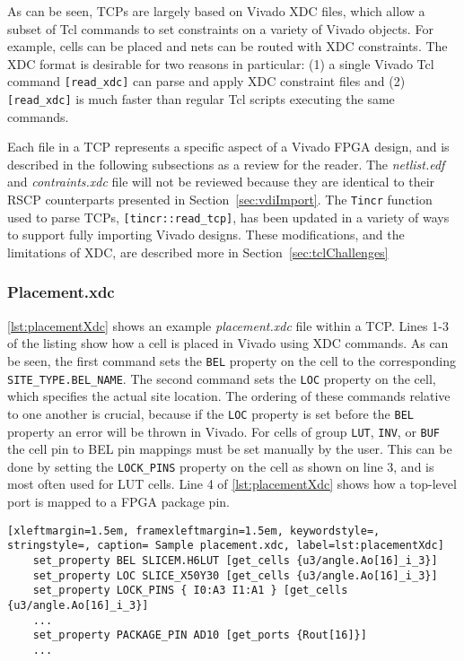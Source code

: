 \noindent As can be seen, TCPs are largely based on Vivado XDC files, which
allow a subset of Tcl commands to set constraints on a variety
of Vivado objects. For example, cells can be placed and nets can be routed with
XDC constraints. The XDC format is desirable for two reasons in particular: (1)
a single Vivado Tcl command \texttt{[read\_xdc]} can parse and apply XDC
constraint files and (2) \texttt{[read\_xdc]} is much faster than regular Tcl
scripts executing the same commands.

Each file in a TCP represents a specific aspect of a Vivado FPGA design, and is
described in the following subsections as a review for the reader. The
\textit{netlist.edf} and \textit{contraints.xdc} file will not be reviewed
because they are identical to their RSCP counterparts presented in
Section~\ref{sec:vdiImport}. The \texttt{Tincr} function used to parse TCPs,
\texttt{[tincr::read\_tcp]}, has been updated in a variety of ways to support
fully importing Vivado designs. These modifications, and the limitations of
XDC, are described more in Section~\ref{sec:tclChallenges}

\subsubsection{Placement.xdc}
\autoref{lst:placementXdc} shows an example \textit{placement.xdc} file within a
TCP. Lines 1-3 of the listing show how a cell is placed in Vivado using XDC
commands. As can be seen, the first command sets the \texttt{BEL} property on
the cell to the corresponding \texttt{SITE\_TYPE.BEL\_NAME}. The second command
sets the \texttt{LOC} property on the cell, which specifies the actual site
location. The ordering of these commands relative to one another is crucial,
because if the \texttt{LOC} property is set before the \texttt{BEL} property an
error will be thrown in Vivado. For cells of group \texttt{LUT}, \texttt{INV},
or \texttt{BUF} the cell pin to BEL pin mappings must be set manually by the user. 
This can be done by setting the \texttt{LOCK\_PINS} property on the cell as
shown on line 3, and is most often used for LUT cells. Line 4 of
\autoref{lst:placementXdc} shows how a top-level port is mapped  to a FPGA
package pin.

\begin{lstlisting}[xleftmargin=1.5em, framexleftmargin=1.5em, keywordstyle=,
stringstyle=, caption= Sample placement.xdc, label=lst:placementXdc]
	set_property BEL SLICEM.H6LUT [get_cells {u3/angle.Ao[16]_i_3}]
	set_property LOC SLICE_X50Y30 [get_cells {u3/angle.Ao[16]_i_3}]
	set_property LOCK_PINS { I0:A3 I1:A1 } [get_cells {u3/angle.Ao[16]_i_3}]
	...
	set_property PACKAGE_PIN AD10 [get_ports {Rout[16]}]
	...	
\end{lstlisting}

